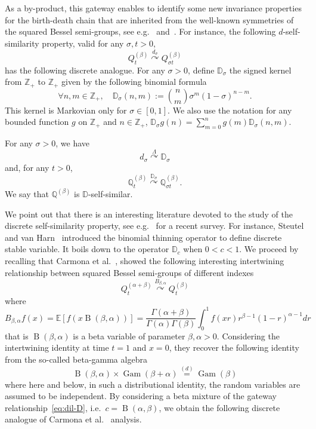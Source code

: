 \documentclass[AHL,Unicode,longabstracts]{cedram}
\DeclareMathOperator{\Gam}{Gam}
\DeclareMathOperator{\rmB}{B}
\newcommand{\df}{\mathrel{:=}}
\newcommand{\ZZ}{\mathbb{Z}}
\newcommand*\E{{\mathbb E}}
\newcommand{\discret}[1]{\mathds{#1}}
\newcommand{\cont}[1]{{#1}}
\newcommand{\Gate}[3]{#1\stackrel{#2}{\curvearrowright}#3}
\let\oldforall\forall
\renewcommand*{\forall}{\mathrel{\oldforall}}
\begin{document}
As a by-product, this gateway enables to identify some new invariance properties for the birth-death chain that are inherited from the well-known symmetries of the squared Bessel semi-groups, see e.g.~\cite{Pitman1981b} and~\cite{Going-Yor-99}. For instance, the following $\cont{d}$-self-similarity property, valid for any $\sigma,t>0$,
\begin{equation}\label{eq:self-bessel}
\Gate{\cont{Q}^{(\beta)}_{t}}{\cont{d}_\sigma}{\cont{Q}^{(\beta)}_{\sigma t}}
\end{equation}
has the following discrete analogue. For any $\sigma>0$, define $\discret{D}_\sigma$ the signed kernel from $\ZZ_+$ to $\ZZ_+$ given by the following binomial formula
\[
\forall n,m\in\ZZ_+,\quad \discret{D}_\sigma(n,m)\df\binom{n}{m}\sigma^m(1-\sigma)^{n-m}.
\]
This kernel is Markovian only for $\sigma\in[0,1]$. We also use the notation for any bounded function $g$ on $\ZZ_+$ and $n\in \ZZ_+$, $
\discret{D}_\sigma g(n)=\sum_{m=0}^n g(m)\discret{D}_\sigma (n,m)$.

\begin{prop}\label{prop:self}
\label{prop:comut-Dd}
For any $\sigma>0$, we have
\begin{equation}\label{eq:dil-D}
\Gate{\cont{d}_\sigma}{\Lambda}{\discret{D}_\sigma}
\end{equation}
and, for any $t>0$,
\begin{equation}\label{eq:self-besseld}
\Gate{\discret{Q}^{(\beta)}_{t}}{\discret{D}_\sigma}{\discret{Q}^{(\beta)}_{\sigma t}}.
\end{equation}
We say that $\discret{Q}^{(\beta)}$ is $\discret{D}$-self-similar.
\end{prop}

We point out that there is an interesting literature devoted to the study of the discrete self-similarity property, see e.g.~\cite{Klebanov} for a recent survey. For instance, Steutel and van Harn~\cite{Steutel-vanHarn} introduced the binomial thinning operator to define discrete stable variable. It boils down to the operator $\discret{D}_c$ when $0<c<1$. We proceed by recalling that Carmona et al.~\cite{Carmona-Petit-Yor-98}, showed the following interesting intertwining relationship between squared Bessel semi-groups of different indexes
\[\label{eq:beta-gamma}
\Gate{Q^{(\alpha+\beta)}_t}{ {{B}}_{\beta,\alpha}}{Q^{(\beta)}_t}
\]
where
\[
{{B}}_{\beta,\alpha}f(x)=\E\left[f(x \rmB({\beta,\alpha}))\right] =
\frac{\Gamma(\alpha+\beta)}{\Gamma(\alpha)\Gamma(\beta)}\int_{0}^{1}f(xr)r^{\beta-1}(1-r)^{\alpha-1}dr
\]
that is $\rmB({\beta,\alpha})$ is a beta variable of parameter $\beta,\alpha>0$. Considering the intertwining identity at time $t=1$ and $x=0$, they recover the following identity from the so-called beta-gamma algebra
\[
\rmB({\beta,\alpha})\times \Gam({\beta+\alpha})\stackrel{(d)}{=}\Gam({\beta})
\]
where here and below, in such a distributional identity, the random variables are assumed to be independent. By considering a beta mixture of the gateway relationship~\eqref{eq:dil-D}, i.e.~$c=\rmB(\alpha,\beta)$, we obtain the following discrete analogue of Carmona et al.~\cite{Carmona-Petit-Yor-98} analysis.
\end{document}
